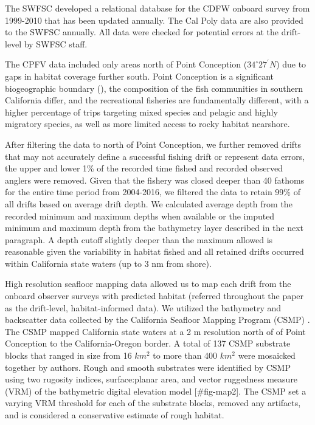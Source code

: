 \documentclass[
  12pt,
  authoryear,
  preprint,
  3p]{elsarticle}
\begin{document}
The SWFSC developed a relational database for the CDFW onboard survey
from 1999-2010\citeyearpar{Monk:2014:DRD} that has been updated
annually. The Cal Poly data are also provided to the SWFSC annually. All
data were checked for potential errors at the drift-level by SWFSC
staff.

The CPFV data included only areas north of Point Conception
(\(34^\circ 27^\prime N\)) due to gaps in habitat coverage further
south. Point Conception is a significant biogeographic boundary
(\citet{Newman:1976:HBP}), the composition of the fish communities in
southern California differ, and the recreational fisheries are
fundamentally different, with a higher percentage of trips targeting
mixed species and pelagic and highly migratory species, as well as more
limited access to rocky habitat nearshore.

After filtering the data to north of Point Conception, we further
removed drifts that may not accurately define a successful fishing drift
or represent data errors, the upper and lower 1\% of the recorded time
fished and recorded observed anglers were removed. Given that the
fishery was closed deeper than 40 fathoms for the entire time period
from 2004-2016, we filtered the data to retain 99\% of all drifts based
on average drift depth. We calculated average depth from the recorded
minimum and maximum depths when available or the imputed minimum and
maximum depth from the bathymetry layer described in the next paragraph.
A depth cutoff slightly deeper than the maximum allowed is reasonable
given the variability in habitat fished and all retained drifts occurred
within California state waters (up to 3 nm from shore).

High resolution seafloor mapping data allowed us to map each drift from
the onboard observer surveys with predicted habitat (referred throughout
the paper as the drift-level, habitat-informed data). We utilized the
bathymetry and backscatter data collected by the California Seafloor
Mapping Program (CSMP) \citep{Golden:2013:CSW}. The CSMP mapped
California state waters at a 2 m resolution north of of Point Conception
to the California-Oregon border. A total of 137 CSMP substrate blocks
that ranged in size from 16 \(km^2\) to more than 400 \(km^2\) were
mosaicked together by authors. Rough and smooth substrates were
identified by CSMP using two rugosity indices, surface:planar area, and
vector ruggedness measure (VRM) of the bathymetric digital elevation
model {[}\#fig-map2{]}. The CSMP set a varying VRM threshold for each of
the substrate blocks, removed any artifacts, and is considered a
conservative estimate of rough habitat.
\end{document}
